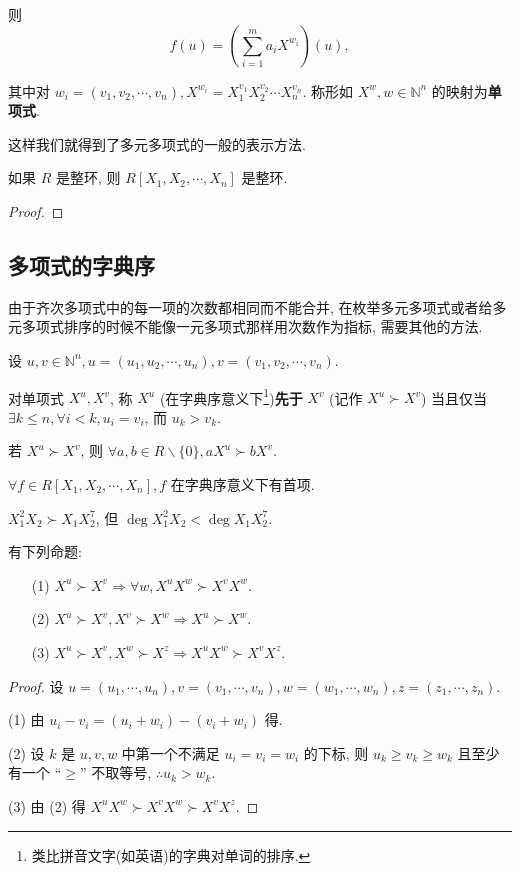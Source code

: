 \documentclass[color=black,device=normal,lang=cn,mode=geye]{elegantnote}
\begin{document}
则
\[f(u)=\left(\sum\limits_{i=1}^ma_iX^{w_i}\right)(u),\]

其中对 $w_i=(v_1,v_2,\cdots,v_n),X^{w_i}=X_1^{v_1}X_2^{v_2}\cdots X_n^{v_n}$. 称形如 $X^w,w\in\mathbb{N}^n$ 的映射为\textbf{单项式}.

这样我们就得到了多元多项式的一般的表示方法.
\begin{proposition}
    如果 $R$ 是整环, 则 $R[X_1,X_2,\cdots,X_n]$ 是整环.
\end{proposition}
\begin{proof}



\end{proof}
\subsection{多项式的字典序}
由于齐次多项式中的每一项的次数都相同而不能合并, 在枚举多元多项式或者给多元多项式排序的时候不能像一元多项式那样用次数作为指标, 需要其他的方法.

设 $u,v\in\mathbb{N}^n,u=(u_1,u_2,\cdots,u_n),v=(v_1,v_2,\cdots,v_n)$.

对单项式 $X^u,X^v$, 称 $X^u$ (在字典序意义下\footnote{类比拼音文字(如英语)的字典对单词的排序.})\textbf{先于} $X^v$ (记作 $X^u\succ X^v$) 当且仅当 $\exists k\leq n,\forall i<k,u_i=v_i$, 而 $u_k>v_k$.

若 $X^u\succ X^v$, 则 $\forall a,b\in R\backslash\{0\},aX^u\succ bX^v$.

$\forall f\in R[X_1,X_2,\cdots,X_n],f$ 在字典序意义下有首项.
\begin{example}
    $X_1^2X_2\succ X_1X_2^7$, 但 $\deg X_1^2X_2<\deg X_1X_2^7$.
\end{example}
有下列命题:
\begin{proposition}
    \begin{itemize}
        \item[(1)] $X^u\succ X^v\Rightarrow\forall w,X^uX^w\succ X^vX^w$.
        \item[(2)] $X^u\succ X^v,X^v\succ X^w\Rightarrow X^u\succ X^w$.
        \item[(3)] $X^u\succ X^v,X^w\succ X^z\Rightarrow X^uX^w\succ X^vX^z$.
    \end{itemize}
\end{proposition}
\begin{proof}
    设 $u=(u_1,\cdots,u_n),v=(v_1,\cdots,v_n),w=(w_1,\cdots,w_n),z=(z_1,\cdots,z_n)$.

    (1) 由 $u_i-v_i=(u_i+w_i)-(v_i+w_i)$ 得.

    (2) 设 $k$ 是 $u,v,w$ 中第一个不满足 $u_i=v_i=w_i$ 的下标, 则 $u_k\geq v_k\geq w_k$ 且至少有一个 ``$\geq$'' 不取等号, $\therefore u_k>w_k$.

    (3) 由 (2) 得 $X^uX^w\succ X^vX^w\succ X^vX^z$.
\end{proof}
\end{document}
